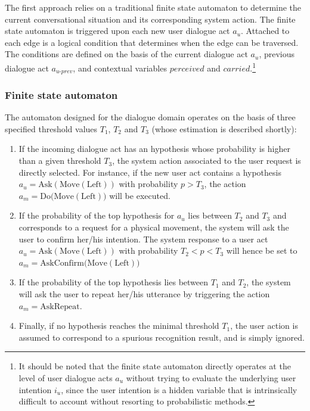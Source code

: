 The first approach relies on a traditional finite state automaton to determine the current conversational situation and its corresponding system action.  The finite state automaton is triggered upon each new user dialogue act $a_u$. Attached to each edge is a logical condition that determines when the edge can be traversed. The conditions are defined on the basis of the current dialogue act $a_u$, previous dialogue act $a_{u\mbox{-}prev}$, and contextual variables $\mathit{perceived}$ and $\mathit{carried}$.\footnote{It should be noted that the finite state automaton directly operates at the level of user dialogue acts $a_u$ without trying to evaluate the underlying user intention $i_u$, since the user intention is a hidden variable that is intrinsically difficult to account without resorting to probabilistic methods.}

\subsubsection*{Finite state automaton}

The automaton designed for the dialogue domain operates on the basis of three specified threshold values $T_1$, $T_2$ and $T_3$ (whose estimation is described shortly):
\begin{enumerate}
\item If the incoming dialogue act has an hypothesis whose probability is higher than a given threshold $T_3$, the system action associated to the user request is directly selected.  For instance, if the new user act contains a hypothesis $a_u = \mathrm{Ask(Move(Left))}$ with probability $p > T_3$, the action $a_m = \mathrm{Do(Move(Left)})$ will be executed.
\item If the probability of the top hypothesis for $a_u$ lies between $T_2$ and $T_3$ and corresponds to a request for a physical movement, the system will ask the user to confirm her/his intention.  The system response to a user act $a_u = \mathrm{Ask(Move(Left))}$ with probability $T_2 < p < T_3$ will hence be set to $a_m = \mathrm{AskConfirm(Move(Left)})$
\item If the probability of the top hypothesis lies between $T_1$ and $T_2$, the system will ask the user to repeat her/his utterance by triggering the action $a_m = \mathrm{AskRepeat}$. 
\item Finally, if no hypothesis reaches the minimal threshold $T_1$, the user action is assumed to correspond to a spurious recognition result, and is simply ignored.
\end{enumerate}

